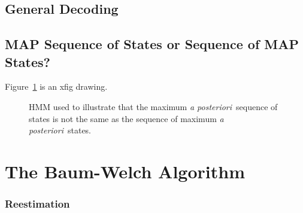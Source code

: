 \documentclass[prelim,showlabels]{book}
\newcommand{\apost}{\emph{a posteriori}\xspace}
\newcommand{\plotsize}{\small}
\begin{document}
\subsection{General Decoding}
\label{sec:GenDecode}

\subsection{MAP Sequence of States or Sequence of MAP States?}
\label{sec:sequenceMAP}

Figure~\ref{fig:sequenceMAP} is an xfig drawing.
\begin{figure}[htbp]
  \centering{\plotsize%
     
  }  
  \caption{HMM used to illustrate that the maximum \apost\ sequence of states is
    not the same as the sequence of maximum \apost\ states.}
\label{fig:sequenceMAP}
\end{figure}

\section{The Baum-Welch Algorithm}
\label{sec:baum_welch}

\addtocounter{subsection}{1}

\subsubsection{Reestimation}
\end{document}
